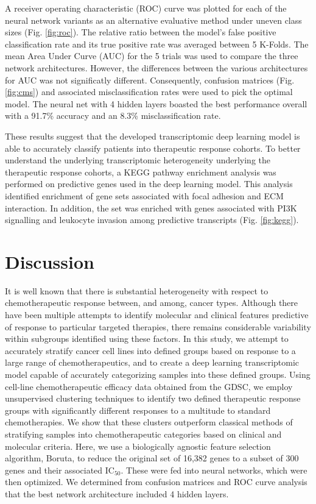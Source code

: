\documentclass[10pt, letterpaper]{article}
\begin{document}
\begin{multicols}{2}
A receiver operating characteristic (ROC) curve was plotted for each of the neural network variants as an alternative evaluative method under uneven class sizes (Fig. \ref{fig:roc}). The relative ratio between the model’s false positive classification rate and its true positive rate was averaged between 5 K-Folds. The mean Area Under Curve (AUC) for the 5 trials was used to compare the three network architectures. However, the differences between the various architectures for AUC was not significatly different. Consequently, confusion matrices (Fig. \ref{fig:cms}) and associated misclassification rates were used to pick the optimal model. The neural net with 4 hidden layers boasted the best performance overall with a 91.7\% accuracy and an 8.3\% misclassification rate.

These results suggest that the developed transcriptomic deep learning model is able to accurately classify patients into therapeutic response cohorts. To better understand the underlying transcriptomic heterogeneity underlying the therapeutic response cohorts, a KEGG pathway enrichment analysis was performed on predictive genes used in the deep learning model. This analysis identified enrichment of gene sets associated with focal adhesion and ECM interaction. In addition, the set was enriched with genes associated with PI3K signalling and leukocyte invasion among predictive transcripts (Fig. \ref{fig:kegg}).


\section{Discussion}
It is well known that there is substantial heterogeneity with respect to chemotherapeutic response between, and among, cancer types. Although there have been multiple attempts to identify molecular and clinical features predictive of response to particular targeted therapies, there remains considerable variability within subgroups identified using these factors. In this study, we attempt to accurately stratify cancer cell lines into defined groups based on response to a large range of chemotherapeutics, and to create a deep learning transcriptomic model capable of accurately categorizing samples into these defined groups. Using cell-line chemotherapeutic efficacy data obtained from the GDSC, we employ unsupervised clustering techniques to identify two defined therapeutic response groups with significantly different responses to a multitude to standard chemotherapies. We show that these clusters outperform classical methods of stratifying samples into chemotherapeutic categories based on clinical and molecular criteria. Here, we use a biologically agnostic feature selection algorithm, Boruta, to reduce the original set of 16,382 genes to a subset of 300 genes and their associated IC$_{50}$. These were fed into neural networks, which were then optimized. We determined from confusion matrices and ROC curve analysis that the best network architecture included 4 hidden layers.


\end{multicols}
\end{document}
